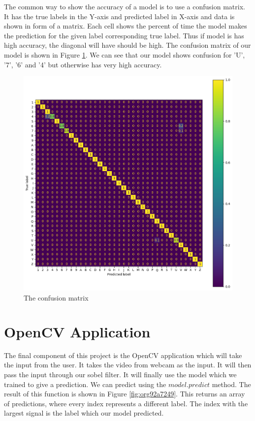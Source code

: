 \documentclass[a4paper,oneside,12pt]{report}
\begin{document}
The common way to show the accuracy of a model is to use a confusion matrix. It has the true labels in the Y-axis and predicted label in X-axis and data is shown in form of a matrix. Each cell shows the percent of time the model makes the prediction for the given label corresponding true label. Thus if model is has high accuracy, the diagonal will have should be high. The confusion matrix of our model is shown in Figure \ref{fig:orgf7e9dcb}. We can see that our model shows confusion for 'U', '7', '6' and '4' but otherwise has very high accuracy.

\begin{figure}[htbp]
\centering
\includegraphics[width=.9\linewidth]{Neural_Network/2025-04-27_03-38-55_confusion_matrix.png}
\caption{\label{fig:orgf7e9dcb}The confusion matrix}
\end{figure}

\chapter{OpenCV Application}
\label{sec:orgcd23868}
The final component of this project is the OpenCV application which will take the input from the user. It takes the video from webcam as the input. It will then pass the input through our sobel filter. It will finally use the model which we trained to give a prediction. We can predict using the \(model.predict\) method. The result of this function is shown in Figure \ref{fig:org92a7249}. This returns an array of predictions, where every index represents a different label. The index with the largest signal is the label which our model predicted.
\end{document}

